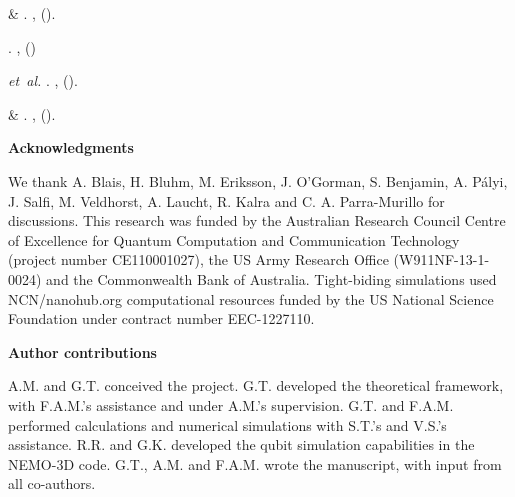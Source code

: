 \documentclass[aps,prb,superscriptaddress,nobibnotes,twocolumn]{revtex4-1}
\begin{document}
\begin{thebibliography}{10}
 \& 
\newblock {}.
\newblock \emph{} \textbf{},
   ().
  
\newblock {}.
\newblock \emph{} \textbf{},
   ()

 \emph{et~al.}
\newblock {}.
\newblock \emph{} \textbf{},
   ().

 \& 
\newblock {}.
\newblock \emph{} \textbf{},
   ().

\end{thebibliography}


\vspace{3mm}
\noindent\textbf{Acknowledgments}

\noindent We thank A. Blais, H. Bluhm, M. Eriksson, J. O'Gorman, S. Benjamin, A. P\'alyi, J. Salfi, M. Veldhorst, A. Laucht, R. Kalra and C. A. Parra-Murillo for discussions. This research was funded by the Australian Research Council Centre of Excellence for Quantum Computation and Communication Technology (project number CE110001027), the US Army Research Office (W911NF-13-1-0024) and the Commonwealth Bank of Australia. Tight-biding simulations used NCN/nanohub.org computational resources funded by the US National Science Foundation under contract number EEC-1227110.


\vspace{3mm}
\noindent\textbf{Author contributions}

\noindent A.M. and G.T. conceived the project.
G.T. developed the theoretical framework, with F.A.M.'s assistance and under A.M.'s supervision.
G.T. and F.A.M. performed calculations and numerical simulations with S.T.'s and V.S.'s assistance.
R.R. and G.K. developed the qubit simulation capabilities in the NEMO-3D code.
G.T., A.M. and F.A.M. wrote the manuscript, with input from all co-authors.
\end{document}
